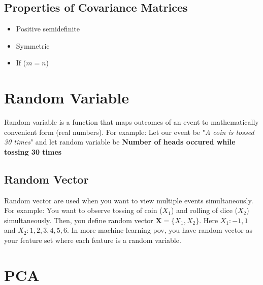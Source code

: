 \documentclass[12pt]{article}
\begin{document}
		
		\subsection{Properties of Covariance Matrices}
			\begin{itemize}
				\item Positive semidefinite
				\item Symmetric
				\item If ($m = n$)
			\end{itemize}


	\section{Random Variable}
		Random variable is a function that maps outcomes of an event to mathematically convenient form (real numbers). For example: Let our event be "\textit{A coin is tossed 30 times}" and let random variable be \textbf{Number of heads occured while tossing 30 times}
		
		\subsection{Random Vector}
			Random vector are used when you want to view multiple events simultaneously. For example: You want to observe tossing of coin ($X_1$) and rolling of dice ($X_2$) simultaneously. Then, you define random vector $\textbf{X} = \{X_1, X_2\}$. Here $X_1: {-1,1}$ and $X_2: {1,2,3,4,5,6}$. In more machine learning pov, you have random vector as your feature set where each feature is a random variable.

	\section{PCA}
	
\end{document}
